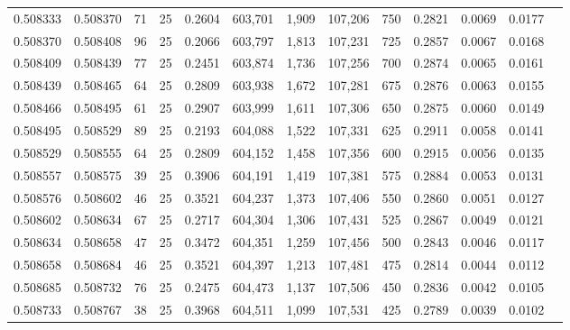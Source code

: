 \begin{tabular}{rrrrrrrrrrrrr}
0.508333 & 0.508370 &  71 &  25 &                                     0.2604 & 603,701 &   1,909 & 107,206 &     750 & 0.2821 & 0.0069 & 0.0177 \\
0.508370 & 0.508408 &  96 &  25 &                                     0.2066 & 603,797 &   1,813 & 107,231 &     725 & 0.2857 & 0.0067 & 0.0168 \\
0.508409 & 0.508439 &  77 &  25 &                                     0.2451 & 603,874 &   1,736 & 107,256 &     700 & 0.2874 & 0.0065 & 0.0161 \\
0.508439 & 0.508465 &  64 &  25 &                                     0.2809 & 603,938 &   1,672 & 107,281 &     675 & 0.2876 & 0.0063 & 0.0155 \\
0.508466 & 0.508495 &  61 &  25 &                                     0.2907 & 603,999 &   1,611 & 107,306 &     650 & 0.2875 & 0.0060 & 0.0149 \\
0.508495 & 0.508529 &  89 &  25 &                                     0.2193 & 604,088 &   1,522 & 107,331 &     625 & 0.2911 & 0.0058 & 0.0141 \\
0.508529 & 0.508555 &  64 &  25 &                                     0.2809 & 604,152 &   1,458 & 107,356 &     600 & 0.2915 & 0.0056 & 0.0135 \\
0.508557 & 0.508575 &  39 &  25 &                                     0.3906 & 604,191 &   1,419 & 107,381 &     575 & 0.2884 & 0.0053 & 0.0131 \\
0.508576 & 0.508602 &  46 &  25 &                                     0.3521 & 604,237 &   1,373 & 107,406 &     550 & 0.2860 & 0.0051 & 0.0127 \\
0.508602 & 0.508634 &  67 &  25 &                                     0.2717 & 604,304 &   1,306 & 107,431 &     525 & 0.2867 & 0.0049 & 0.0121 \\
0.508634 & 0.508658 &  47 &  25 &                                     0.3472 & 604,351 &   1,259 & 107,456 &     500 & 0.2843 & 0.0046 & 0.0117 \\
0.508658 & 0.508684 &  46 &  25 &                                     0.3521 & 604,397 &   1,213 & 107,481 &     475 & 0.2814 & 0.0044 & 0.0112 \\
0.508685 & 0.508732 &  76 &  25 &                                     0.2475 & 604,473 &   1,137 & 107,506 &     450 & 0.2836 & 0.0042 & 0.0105 \\
0.508733 & 0.508767 &  38 &  25 &                                     0.3968 & 604,511 &   1,099 & 107,531 &     425 & 0.2789 & 0.0039 & 0.0102 \\

\end{tabular}
